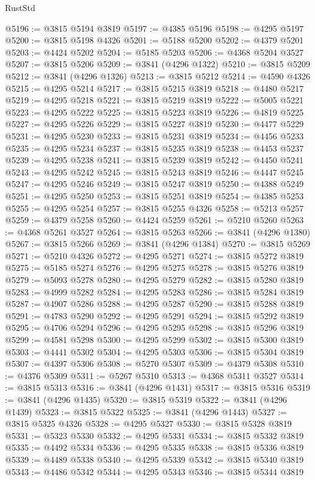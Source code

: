 \begin{lexlean}{RustStd}
\begin{coremodule}
@5196 := @3815 @5194 @3819
@5197 := @4385 @5196
@5198 := @4295 @5197
@5200 := @3815 @5198 @4326
@5201 := @5188 @5200
@5202 := @4379 @5201
@5203 := @4424 @5202
@5204 := @5185 @5203
@5206 := @4368 @5204 @3527
@5207 := @3815 @5206
@5209 := @3841 (@4296 @1322)
@5210 := @3815 @5209
@5212 := @3841 (@4296 @1326)
@5213 := @3815 @5212
@5214 := @4590 @4326
@5215 := @4295 @5214
@5217 := @3815 @5215 @3819
@5218 := @4480 @5217
@5219 := @4295 @5218
@5221 := @3815 @5219 @3819
@5222 := @5005 @5221
@5223 := @4295 @5222
@5225 := @3815 @5223 @3819
@5226 := @4819 @5225
@5227 := @4295 @5226
@5229 := @3815 @5227 @3819
@5230 := @4477 @5229
@5231 := @4295 @5230
@5233 := @3815 @5231 @3819
@5234 := @4456 @5233
@5235 := @4295 @5234
@5237 := @3815 @5235 @3819
@5238 := @4453 @5237
@5239 := @4295 @5238
@5241 := @3815 @5239 @3819
@5242 := @4450 @5241
@5243 := @4295 @5242
@5245 := @3815 @5243 @3819
@5246 := @4447 @5245
@5247 := @4295 @5246
@5249 := @3815 @5247 @3819
@5250 := @4388 @5249
@5251 := @4295 @5250
@5253 := @3815 @5251 @3819
@5254 := @4385 @5253
@5255 := @4295 @5254
@5257 := @3815 @5255 @4326
@5258 := @5213 @5257
@5259 := @4379 @5258
@5260 := @4424 @5259
@5261 := @5210 @5260
@5263 := @4368 @5261 @3527
@5264 := @3815 @5263
@5266 := @3841 (@4296 @1380)
@5267 := @3815 @5266
@5269 := @3841 (@4296 @1384)
@5270 := @3815 @5269
@5271 := @5210 @4326
@5272 := @4295 @5271
@5274 := @3815 @5272 @3819
@5275 := @5185 @5274
@5276 := @4295 @5275
@5278 := @3815 @5276 @3819
@5279 := @5093 @5278
@5280 := @4295 @5279
@5282 := @3815 @5280 @3819
@5283 := @4999 @5282
@5284 := @4295 @5283
@5286 := @3815 @5284 @3819
@5287 := @4907 @5286
@5288 := @4295 @5287
@5290 := @3815 @5288 @3819
@5291 := @4783 @5290
@5292 := @4295 @5291
@5294 := @3815 @5292 @3819
@5295 := @4706 @5294
@5296 := @4295 @5295
@5298 := @3815 @5296 @3819
@5299 := @4581 @5298
@5300 := @4295 @5299
@5302 := @3815 @5300 @3819
@5303 := @4441 @5302
@5304 := @4295 @5303
@5306 := @3815 @5304 @3819
@5307 := @4397 @5306
@5308 := @5270 @5307
@5309 := @4379 @5308
@5310 := @4376 @5309
@5311 := @5267 @5310
@5313 := @4368 @5311 @3527
@5314 := @3815 @5313
@5316 := @3841 (@4296 @1431)
@5317 := @3815 @5316
@5319 := @3841 (@4296 @1435)
@5320 := @3815 @5319
@5322 := @3841 (@4296 @1439)
@5323 := @3815 @5322
@5325 := @3841 (@4296 @1443)
@5327 := @3815 @5325 @4326
@5328 := @4295 @5327
@5330 := @3815 @5328 @3819
@5331 := @5323 @5330
@5332 := @4295 @5331
@5334 := @3815 @5332 @3819
@5335 := @4492 @5334
@5336 := @4295 @5335
@5338 := @3815 @5336 @3819
@5339 := @4489 @5338
@5340 := @4295 @5339
@5342 := @3815 @5340 @3819
@5343 := @4486 @5342
@5344 := @4295 @5343
@5346 := @3815 @5344 @3819

\end{coremodule}
\end{lexlean}
